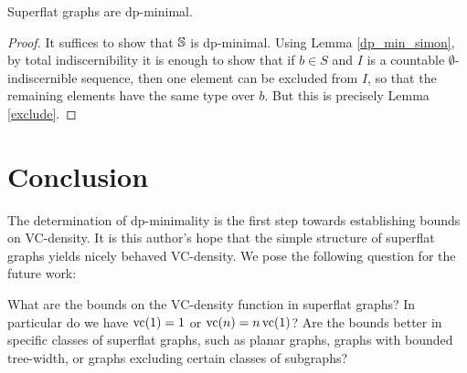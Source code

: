 \begin{Theorem} \label{flat_dp_thm}
  Superflat graphs are dp-minimal.
\end{Theorem}
\begin{proof}
  It suffices to show that $\mathbb S$ is dp-minimal.
  Using Lemma \ref{dp_min_simon}, by total indiscernibility
  it is enough to show that if $b \in S$ and $I$ is a countable $\emptyset$-indiscernible sequence,
  then one element can be excluded from $I$, so that the remaining elements have the same type over $b$.
  But this is precisely Lemma \ref{exclude}.
\end{proof}

\section{Conclusion}
The determination of dp-minimality is the first step towards establishing bounds on VC-density.
It is this author's hope that the simple structure of superflat graphs yields nicely behaved VC-density.
We pose the following question for the future work:
\begin{openq} 
  What are the bounds on the VC-density function in superflat graphs?
  In particular do we have $\operatorname{vc}(1) = 1$ or $\operatorname{vc}(n) = n \operatorname{vc}(1)$?
  Are the bounds better in specific classes of superflat graphs,
  such as planar graphs, graphs with bounded tree-width, or graphs excluding certain classes of subgraphs?
\end{openq}
